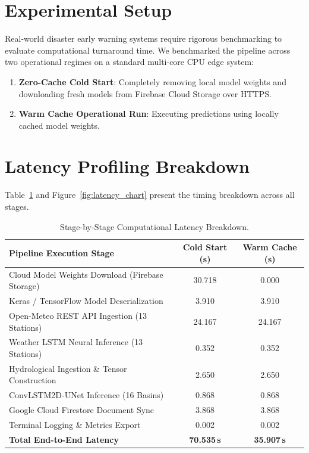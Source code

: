 \documentclass[12pt,a4paper,oneside]{report}
\begin{document}
\section{Experimental Setup}
Real-world disaster early warning systems require rigorous benchmarking to evaluate computational turnaround time. We benchmarked the pipeline across two operational regimes on a standard multi-core CPU edge system:
\begin{enumerate}
    \item \textbf{Zero-Cache Cold Start}: Completely removing local model weights and downloading fresh models from Firebase Cloud Storage over HTTPS.
    \item \textbf{Warm Cache Operational Run}: Executing predictions using locally cached model weights.
\end{enumerate}

\section{Latency Profiling Breakdown}
Table~\ref{tab:latency_data} and Figure~\ref{fig:latency_chart} present the timing breakdown across all stages.

\begin{table}[H]
\centering
\caption{Stage-by-Stage Computational Latency Breakdown.}
\label{tab:latency_data}
\begin{tabular}{lcc}
\toprule
\textbf{Pipeline Execution Stage} & \textbf{Cold Start (s)} & \textbf{Warm Cache (s)} \\
\midrule
Cloud Model Weights Download (Firebase Storage) & 30.718 & 0.000 \\
Keras / TensorFlow Model Deserialization & 3.910 & 3.910 \\
Open-Meteo REST API Ingestion (13 Stations) & 24.167 & 24.167 \\
Weather LSTM Neural Inference (13 Stations) & 0.352 & 0.352 \\
Hydrological Ingestion \& Tensor Construction & 2.650 & 2.650 \\
ConvLSTM2D-UNet Inference (16 Basins) & 0.868 & 0.868 \\
Google Cloud Firestore Document Sync & 3.868 & 3.868 \\
Terminal Logging \& Metrics Export & 0.002 & 0.002 \\
\midrule
\textbf{Total End-to-End Latency} & \textbf{70.535\,s} & \textbf{35.907\,s} \\
\bottomrule
\end{tabular}
\end{table}
\end{document}
